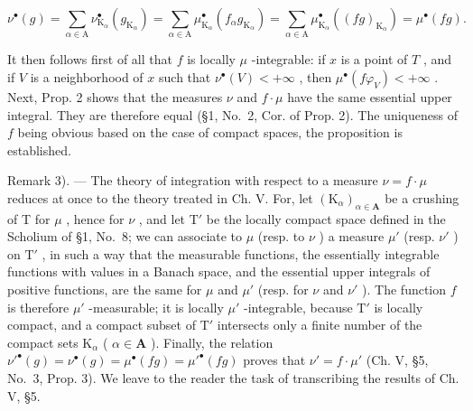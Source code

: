 \[
\nu^ {\bullet} (g) = \sum_ {\alpha \in \mathrm{A}} \nu_ {\mathrm{K} _ {\alpha}} ^ {\bullet} \left(g _ {\mathrm{K} _ {\alpha}}\right) = \sum_ {\alpha \in \mathrm{A}} \mu_ {\mathrm{K} _ {\alpha}} ^ {\bullet} \left(f _ {\alpha} g _ {\mathrm{K} _ {\alpha}}\right) = \sum_ {\alpha \in \mathrm{A}} \mu_ {\mathrm{K} _ {\alpha}} ^ {\bullet} ((f g) _ {\mathrm{K} _ {\alpha}}) = \mu^ {\bullet} (f g).
\]

It then follows first of all that \(f\) is locally \(\mu\) -integrable: if \(x\) is a point of \(T\) , and if \(V\) is a neighborhood of \(x\) such that \(\nu^{\bullet}(V) < +\infty\) , then \(\mu^{\bullet}(f\varphi_V) < +\infty\) . Next, Prop. 2 shows that the measures \(\nu\) and \(f \cdot \mu\) have the same essential upper integral. They are therefore equal (§1, No.~2, Cor. of Prop. 2). The uniqueness of \(f\) being obvious based on the case of compact spaces, the proposition is established.

Remark 3). --- The theory of integration with respect to a measure \(\nu = f \cdot \mu\) reduces at once to the theory treated in Ch. V. For, let \((\mathrm{K}_{\alpha})_{\alpha \in \mathbf{A}}\) be a crushing of T for \(\mu\) , hence for \(\nu\) , and let \(\mathrm{T}'\) be the locally compact space defined in the Scholium of §1, No.~8; we can associate to \(\mu\) (resp. to \(\nu\) ) a measure \(\mu'\) (resp. \(\nu'\) ) on \(\mathrm{T}'\) , in such a way that the measurable functions, the essentially integrable functions with values in a Banach space, and the essential upper integrals of positive functions, are the same for \(\mu\) and \(\mu'\) (resp. for \(\nu\) and \(\nu'\) ). The function \(f\) is therefore \(\mu'\) -measurable; it is locally \(\mu'\) -integrable, because \(\mathrm{T}'\) is locally compact, and a compact subset of \(\mathrm{T}'\) intersects only a finite number of the compact sets \(\mathrm{K}_{\alpha}\) ( \(\alpha \in \mathbf{A}\) ). Finally, the relation \(\nu'^{\bullet}(g) = \nu^{\bullet}(g) = \mu^{\bullet}(fg) = \mu'^{\bullet}(fg)\) proves that \(\nu' = f \cdot \mu'\) (Ch. V, §5, No.~3, Prop. 3). We leave to the reader the task of transcribing the results of Ch. V, §5.

